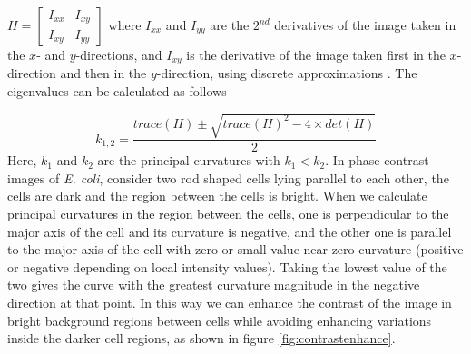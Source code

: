 \documentclass[journal]{IEEEtran}
\begin{document}
$H = \begin{bmatrix}
I_{xx} & I_{xy} \\
I_{xy} & I_{yy}
\end{bmatrix}$
where $I_{xx}$ and $I_{yy}$ are the $2^{nd}$ derivatives of the image taken in the $x$- and $y$-directions, and $I_{xy}$ is the derivative of the image taken first in the $x$-direction and then in the $y$-direction, using discrete approximations \cite{woodfordnumerical2012}. The eigenvalues can be calculated as follows 


\begin{equation}
k_{1,2} = \frac{trace(H)\pm \sqrt{trace(H)^2 -4\times det(H)} }{2}
\end{equation}
Here, $k_1$ and $k_2$ are the principal curvatures with $k_1 < k_2$.  In phase contrast images of \textit{E. coli}, consider two rod shaped cells lying parallel to each other, the cells are dark and the region between the cells is bright. When we calculate principal curvatures in the region between the cells, one is perpendicular to the major axis of the cell and its curvature is negative, and the other one is parallel to the major axis of the cell with zero or small value near zero curvature (positive or negative depending on local intensity values). Taking the lowest value of the two gives the curve with the greatest curvature magnitude in the negative direction at that point. In this way we can enhance the contrast of the image in bright background regions between cells while avoiding enhancing variations inside the darker cell regions, as shown in figure \ref{fig:contrastenhance}. 
\end{document}
